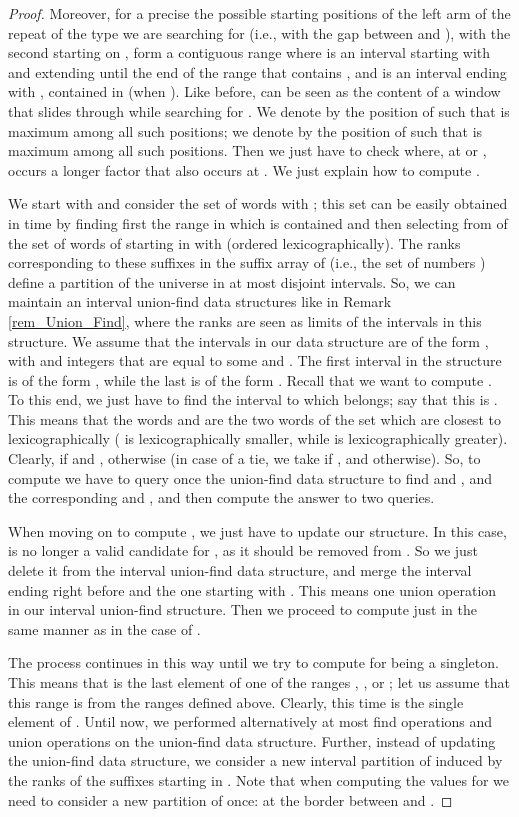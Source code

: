 \documentclass[final]{dmtcs-episciences}
\begin{document}
\begin{proof}
Moreover, for a precise  the possible starting positions of the left arm  of the repeat  of the type we are searching for (i.e., with the gap between  and ), with the second  starting on , form a contiguous range  where  is an interval starting with  and extending until the end of the range  that contains , and  is an interval ending with , contained in  (when ). Like before,  can be seen as the content of a window that slides through  while searching for . We denote by  the position of  such that  is maximum among all such positions; we denote by  the position of  such that  is maximum among all such positions. Then we just have to check where, at  or , occurs a longer factor that also occurs at . We just explain how to compute . 

We start with  and consider the set of words  with ; this set can be easily obtained in  time by finding first the range  in which  is contained and then selecting from  of the set of words  of  starting in  with  (ordered lexicographically). The ranks corresponding to these suffixes in the suffix array of  (i.e., the set of numbers ) define a partition of the universe  in at most  disjoint intervals. So, we can maintain an interval union-find data structures like in Remark \ref{rem_Union_Find}, where the ranks are seen as limits of the intervals in this structure. We assume that the intervals in our data structure are of the form , with  and  integers that are equal to some  and . The first interval in the structure is of the form , while the last is of the form . Recall that we want to compute . To this end, we just have to find the interval to which  belongs; say that this is . This means that the words  and  are the two words of the set  which are closest to  lexicographically ( is lexicographically smaller, while  is lexicographically greater). Clearly,  if  and , otherwise (in case of a tie, we take  if , and  otherwise). So, to compute  we have to query once the union-find data structure to find  and , and the corresponding  and , and then compute the answer to two  queries. 

When moving on to compute , we just have to update our structure. In this case,  is no longer a valid candidate for , as it should be removed from . So we just delete it from the interval union-find data structure, and merge the interval ending right before  and the one starting with . This means one union operation in our interval union-find structure. Then we proceed to compute  just in the same manner as in the case of .

The process continues in this way until we try to compute  for  being a singleton. This means that  is the last element of one of the ranges , , or ; let us assume that this range is  from the ranges defined above. Clearly, this time  is the single element of . Until now, we performed alternatively at most  find operations and  union operations on the union-find data structure. Further, instead of updating the union-find data structure, we consider a new interval partition of  induced by the ranks of the  suffixes starting in . Note that when computing the values  for  we need to consider a new partition of  once: at the border between  and .


\end{proof}
\end{document}
